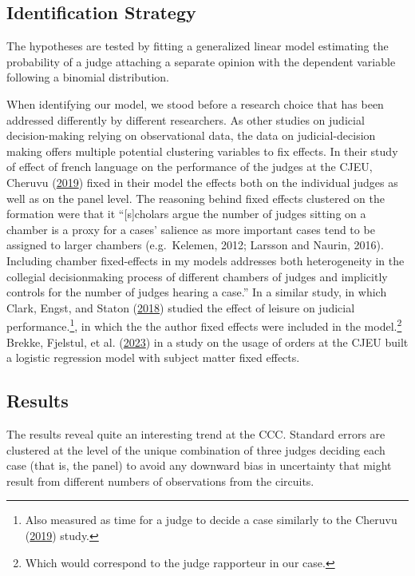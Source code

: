 \documentclass[
  11pt,
]{article}
\begin{document}
\hypertarget{identification-strategy}{%
\subsection{Identification Strategy}\label{identification-strategy}}

The hypotheses are tested by fitting a generalized linear model
estimating the probability of a judge attaching a separate opinion with
the dependent variable following a binomial distribution.

When identifying our model, we stood before a research choice that has
been addressed differently by different researchers. As other studies on
judicial decision-making relying on observational data, the data on
judicial-decision making offers multiple potential clustering variables
to fix effects. In their study of effect of french language on the
performance of the judges at the CJEU, Cheruvu
(\protect\hyperlink{ref-cheruvuHowInstitutionalConstraints2019}{2019})
fixed in their model the effects both on the individual judges as well
as on the panel level. The reasoning behind fixed effects clustered on
the formation were that it ``{[}s{]}cholars argue the number of judges
sitting on a chamber is a proxy for a cases' salience as more important
cases tend to be assigned to larger chambers (e.g.~Kelemen, 2012;
Larsson and Naurin, 2016). Including chamber fixed-effects in my models
addresses both heterogeneity in the collegial decisionmaking process of
different chambers of judges and implicitly controls for the number of
judges hearing a case.'' In a similar study, in which Clark, Engst, and
Staton (\protect\hyperlink{ref-clarkEstimatingEffectLeisure2018}{2018})
studied the effect of leisure on judicial performance.\footnote{Also
  measured as time for a judge to decide a case similarly to the Cheruvu
  (\protect\hyperlink{ref-cheruvuHowInstitutionalConstraints2019}{2019})
  study.}, in which the the author fixed effects were included in the
model.\footnote{Which would correspond to the judge rapporteur in our
  case.} Brekke, Fjelstul, et al.
(\protect\hyperlink{ref-brekkeCJEUDatabasePlatform2023}{2023}) in a
study on the usage of orders at the CJEU built a logistic regression
model with subject matter fixed effects.

\hypertarget{results}{%
\subsection{Results}\label{results}}

The results reveal quite an interesting trend at the CCC. Standard
errors are clustered at the level of the unique combination of three
judges deciding each case (that is, the panel) to avoid any downward
bias in uncertainty that might result from different numbers of
observations from the circuits.
\end{document}
